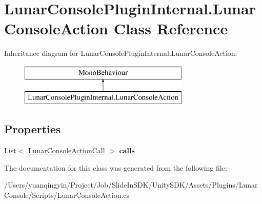 \hypertarget{class_lunar_console_plugin_internal_1_1_lunar_console_action}{}\section{Lunar\+Console\+Plugin\+Internal.\+Lunar\+Console\+Action Class Reference}
\label{class_lunar_console_plugin_internal_1_1_lunar_console_action}
Inheritance diagram for Lunar\+Console\+Plugin\+Internal.\+Lunar\+Console\+Action\+:\begin{figure}[H]
\begin{center}
\leavevmode
\includegraphics[height=2.000000cm]{class_lunar_console_plugin_internal_1_1_lunar_console_action}
\end{center}
\end{figure}
\subsection*{Properties}
\begin{DoxyCompactItemize}
\item 
\mbox{\label{class_lunar_console_plugin_internal_1_1_lunar_console_action_af9f1480c668338cc5793c04c5ed961ab}} 
List$<$ \mbox{\hyperlink{class_lunar_console_plugin_internal_1_1_lunar_console_action_call}{Lunar\+Console\+Action\+Call}} $>$ {\bfseries calls}
\end{DoxyCompactItemize}


The documentation for this class was generated from the following file\+:\begin{DoxyCompactItemize}
\item 
/\+Users/yuanqingyin/\+Project/\+Job/\+Slide\+In\+S\+D\+K/\+Unity\+S\+D\+K/\+Assets/\+Plugins/\+Lunar\+Console/\+Scripts/Lunar\+Console\+Action.\+cs\end{DoxyCompactItemize}
